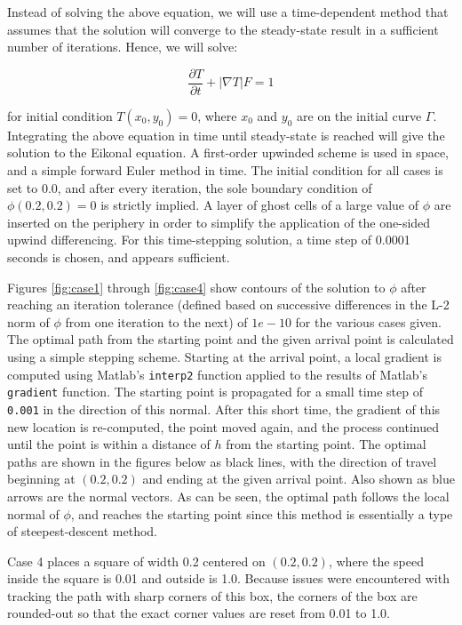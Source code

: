 \documentclass[10pt]{article}
\newcommand{\beq}{\begin{equation}}
\newcommand{\eeq}{\end{equation}}
\begin{document}
Instead of solving the above equation, we will use a time-dependent method that assumes that the solution will converge to the steady-state result in a sufficient number of iterations. Hence, we will solve:

\beq
\frac{\partial T}{\partial t}+|\nabla T|F=1
\eeq

for initial condition \(T(x_0, y_0)=0\), where \(x_0\) and \(y_0\) are on the initial curve \(\Gamma\). Integrating the above equation in time until steady-state is reached will give the solution to the Eikonal equation. A first-order upwinded scheme is used in space, and a simple forward Euler method in time. The initial condition for all cases is set to 0.0, and after every iteration, the sole boundary condition of \(\phi(0.2, 0.2)=0\) is strictly implied. A layer of ghost cells of a large value of \(\phi\) are inserted on the periphery in order to simplify the application of the one-sided upwind differencing. For this time-stepping solution, a time step of 0.0001 seconds is chosen, and appears sufficient.

Figures \ref{fig:case1} through \ref{fig:case4} show contours of the solution to \(\phi\) after reaching an iteration tolerance (defined based on successive differences in the L-2 norm of \(\phi\) from one iteration to the next) of \(1e-10\) for the various cases given. The optimal path from the starting point and the given arrival point is calculated using a simple stepping scheme. Starting at the arrival point, a local gradient is computed using Matlab's {\tt interp2} function applied to the results of Matlab's {\tt gradient} function. The starting point is propagated for a small time step of {\tt 0.001} in the direction of this normal. After this short time, the gradient of this new location is re-computed, the point moved again, and the process continued until the point is within a distance of \(h\) from the starting point. The optimal paths are shown in the figures below as black lines, with the direction of travel beginning at \((0.2, 0.2)\) and ending at the given arrival point. Also shown as blue arrows are the normal vectors. As can be seen, the optimal path follows the local normal of \(\phi\), and reaches the starting point since this method is essentially a type of steepest-descent method. 

Case 4 places a square of width 0.2 centered on \((0.2, 0.2)\), where the speed inside the square is 0.01 and outside is 1.0. Because issues were encountered with tracking the path with sharp corners of this box, the corners of the box are rounded-out so that the exact corner values are reset from 0.01 to 1.0.
\end{document}
